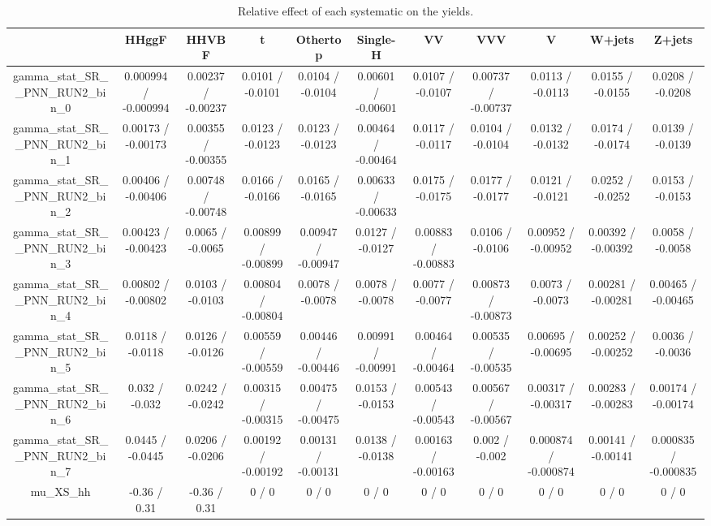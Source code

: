 \documentclass[10pt]{article}
\begin{document}
\begin{table}[htbp]
\begin{center}
\begin{tabular}{|c|c|c|c|c|c|c|c|c|c|c|}
\hline 
      & HHggF      & HHVBF      & t      & Othertop      & Single-H      & VV      & VVV      & V      & W+jets      & Z+jets \\ 
\hline 
  gamma_stat_SR__PNN_RUN2_bin_0 & 0.000994 / -0.000994 & 0.00237 / -0.00237 & 0.0101 / -0.0101 & 0.0104 / -0.0104 & 0.00601 / -0.00601 & 0.0107 / -0.0107 & 0.00737 / -0.00737 & 0.0113 / -0.0113 & 0.0155 / -0.0155 & 0.0208 / -0.0208 \\ 
  gamma_stat_SR__PNN_RUN2_bin_1 & 0.00173 / -0.00173 & 0.00355 / -0.00355 & 0.0123 / -0.0123 & 0.0123 / -0.0123 & 0.00464 / -0.00464 & 0.0117 / -0.0117 & 0.0104 / -0.0104 & 0.0132 / -0.0132 & 0.0174 / -0.0174 & 0.0139 / -0.0139 \\ 
  gamma_stat_SR__PNN_RUN2_bin_2 & 0.00406 / -0.00406 & 0.00748 / -0.00748 & 0.0166 / -0.0166 & 0.0165 / -0.0165 & 0.00633 / -0.00633 & 0.0175 / -0.0175 & 0.0177 / -0.0177 & 0.0121 / -0.0121 & 0.0252 / -0.0252 & 0.0153 / -0.0153 \\ 
  gamma_stat_SR__PNN_RUN2_bin_3 & 0.00423 / -0.00423 & 0.0065 / -0.0065 & 0.00899 / -0.00899 & 0.00947 / -0.00947 & 0.0127 / -0.0127 & 0.00883 / -0.00883 & 0.0106 / -0.0106 & 0.00952 / -0.00952 & 0.00392 / -0.00392 & 0.0058 / -0.0058 \\ 
  gamma_stat_SR__PNN_RUN2_bin_4 & 0.00802 / -0.00802 & 0.0103 / -0.0103 & 0.00804 / -0.00804 & 0.0078 / -0.0078 & 0.0078 / -0.0078 & 0.0077 / -0.0077 & 0.00873 / -0.00873 & 0.0073 / -0.0073 & 0.00281 / -0.00281 & 0.00465 / -0.00465 \\ 
  gamma_stat_SR__PNN_RUN2_bin_5 & 0.0118 / -0.0118 & 0.0126 / -0.0126 & 0.00559 / -0.00559 & 0.00446 / -0.00446 & 0.00991 / -0.00991 & 0.00464 / -0.00464 & 0.00535 / -0.00535 & 0.00695 / -0.00695 & 0.00252 / -0.00252 & 0.0036 / -0.0036 \\ 
  gamma_stat_SR__PNN_RUN2_bin_6 & 0.032 / -0.032 & 0.0242 / -0.0242 & 0.00315 / -0.00315 & 0.00475 / -0.00475 & 0.0153 / -0.0153 & 0.00543 / -0.00543 & 0.00567 / -0.00567 & 0.00317 / -0.00317 & 0.00283 / -0.00283 & 0.00174 / -0.00174 \\ 
  gamma_stat_SR__PNN_RUN2_bin_7 & 0.0445 / -0.0445 & 0.0206 / -0.0206 & 0.00192 / -0.00192 & 0.00131 / -0.00131 & 0.0138 / -0.0138 & 0.00163 / -0.00163 & 0.002 / -0.002 & 0.000874 / -0.000874 & 0.00141 / -0.00141 & 0.000835 / -0.000835 \\ 
  mu_XS_hh & -0.36 / 0.31 & -0.36 / 0.31 & 0 / 0 & 0 / 0 & 0 / 0 & 0 / 0 & 0 / 0 & 0 / 0 & 0 / 0 & 0 / 0 \\ 
\hline 
\end{tabular} 
\caption{Relative effect of each systematic on the yields.} 
\end{center} 
\end{table} 
\end{document}

